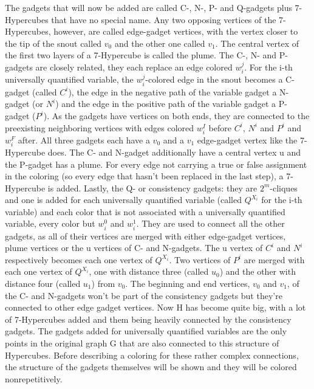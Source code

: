 \documentclass[12pt,a4paper]{article}
\begin{document}
The gadgets that will now be added are called C-, N-, P- and Q-gadgets plus 7-Hypercubes that have no special name. Any two opposing vertices of the 7-Hypercubes, however, are called edge-gadget vertices, with the vertex closer to the tip of the snout called $v_0$ and the other one called $v_1$. The central vertex of the first two layers of a 7-Hypercube is called the plume. The C-, N- and P-gadgets are closely related, they each replace an edge colored $w^j_i$. For the i-th universally quantified variable, the $w^j_i$-colored edge in the snout becomes a C-gadget (called $C^i$), the edge in the negative path of the variable gadget a N-gadget (or $N^i$) and the edge in the positive path of the variable gadget a P-gadget ($P^i$). As the gadgets have vertices on both ends, they are connected to the preexisting neighboring vertices with edges colored $w^I_i$ before $C^i$, $N^i$ and $P^i$ and $w^F_i$ after. All three gadgets each have a $v_0$ and a $v_1$ edge-gadget vertex like the 7-Hypercube does. The C- and N-gadget additionally have a central vertex u and the P-gadget has a plume. For every edge not carrying a true or false assignment in the coloring (so every edge that hasn't been replaced in the last step), a 7-Hypercube is added. Lastly, the Q- or consistency gadgets: they are $2^m$-cliques and one is added for each universally quantified variable (called $Q^{X_i}$ for the i-th variable) and each color that is not associated with a universally quantified variable, every color but $w^0_i$ and $w^1_i$. They are used to connect all the other gadgets, as all of their vertices are merged with either edge-gadget vertices, plume vertices or the u vertices of C- and N-gadgets. The u vertex of $C^i$ and $N^i$ respectively becomes each one vertex of $Q^{X_i}$. Two vertices of $P^i$ are merged with each one vertex of $Q^{X_i}$, one with distance three (called $u_0$) and the other with distance four (called $u_1$) from $v_0$. The beginning and end vertices, $v_0$ and $v_1$, of the C- and N-gadgets won't be part of the consistency gadgets but they're connected to other edge gadget vertices.
\newline
Now H has become quite big, with a lot of 7-Hypercubes added and them being heavily connected by the consistency gadgets. The gadgets added for universally quantified variables are the only points in the original graph G that are also connected to this structure of Hypercubes. Before describing a coloring for these rather complex connections, the structure of the gadgets themselves will be shown and they will be colored nonrepetitively. 
  
\end{document}
